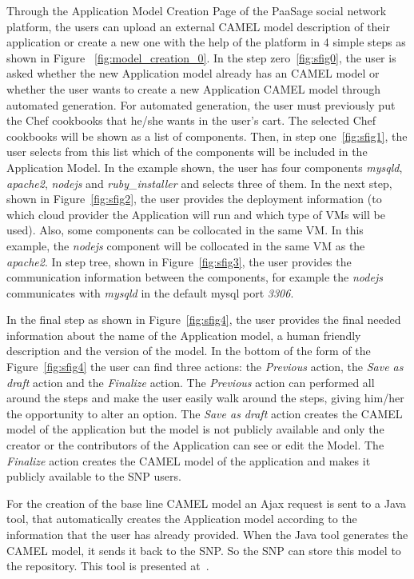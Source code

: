 Through the Application Model Creation Page of the PaaSage social network platform, the users can upload an external CAMEL model description of their application or create a new one with the help of the platform in 4 simple steps as shown in Figure ~\ref{fig:model_creation_0}. In the step zero~\ref{fig:sfig0}, the user is asked whether the new Application model already has an CAMEL model or whether the user wants to create a new Application CAMEL model through automated generation. For automated generation, the user must previously put the Chef cookbooks that he/she wants in the user's cart. The selected Chef cookbooks will be shown as a list of components. Then, in step one~\ref{fig:sfig1}, the user selects from this list which of the components will be included in the Application Model. 
In the example shown, the user has four components {\it mysqld}, {\it apache2}, {\it nodejs} and 
{\it ruby\_installer} and selects three of them. In the next step, shown in Figure~\ref{fig:sfig2}, the user provides the deployment information (to which cloud provider the Application will run and which type of VMs will be used). Also, some components can be collocated in the same VM. In this example, the {\it nodejs} component will be collocated in the same VM as the {\it apache2}. In step tree, shown in Figure~\ref{fig:sfig3}, the user provides the communication information between the components, for example the 
{\it nodejs} communicates with {\it mysqld} in the default mysql port {\it 3306}.

In the final step as shown in Figure~\ref{fig:sfig4}, the user provides the final needed information about the name of the Application model, a human friendly description and the version of the model. In the bottom of the form of the Figure~\ref{fig:sfig4} the user can find three actions: the \emph{Previous} action, the \emph{Save as draft} action and the \emph{Finalize} action. The \emph{Previous} action can performed all around the steps and make the user easily walk around the steps, giving him/her the opportunity to alter an option. The \emph{Save as draft} action creates the CAMEL model of the application but the model is not publicly available and only the creator or the contributors of the Application can see or edit the Model. The \emph{Finalize} action creates the CAMEL model of the application and makes it publicly available to the SNP users. 

For the creation of the base line CAMEL model an Ajax request is sent to a Java tool, that automatically creates the Application model according to the information that the user has already provided. When the Java tool generates the CAMEL model, it sends it back to the SNP. So the SNP can store this model to the repository. This tool is presented at~\cite{papoutsakis2014reducing}. 

